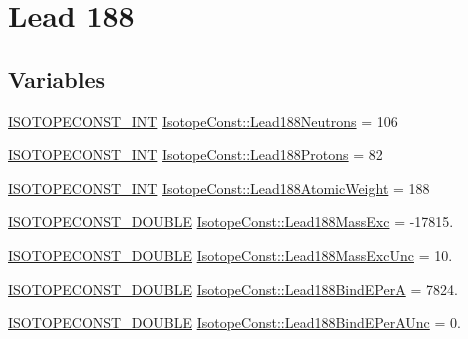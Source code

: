 \hypertarget{group___isotope_const-_lead-_pb188}{}\section{Lead 188}
\label{group___isotope_const-_lead-_pb188}
\subsection*{Variables}
\begin{DoxyCompactItemize}
\item 
\mbox{\hyperlink{group___isotope_const-_macros_ga5f18360b3e99483a35c32d789e62621c}{I\+S\+O\+T\+O\+P\+E\+C\+O\+N\+S\+T\+\_\+\+I\+NT}} \mbox{\hyperlink{group___isotope_const-_lead-_pb188_gac8e494fa1e14b751e539c2e1c9d168f4}{Isotope\+Const\+::\+Lead188\+Neutrons}} = 106
\item 
\mbox{\hyperlink{group___isotope_const-_macros_ga5f18360b3e99483a35c32d789e62621c}{I\+S\+O\+T\+O\+P\+E\+C\+O\+N\+S\+T\+\_\+\+I\+NT}} \mbox{\hyperlink{group___isotope_const-_lead-_pb188_gaf8585b1232ee8e63455d3f2e194e5493}{Isotope\+Const\+::\+Lead188\+Protons}} = 82
\item 
\mbox{\hyperlink{group___isotope_const-_macros_ga5f18360b3e99483a35c32d789e62621c}{I\+S\+O\+T\+O\+P\+E\+C\+O\+N\+S\+T\+\_\+\+I\+NT}} \mbox{\hyperlink{group___isotope_const-_lead-_pb188_ga2e9897e510550a646369dc732532142f}{Isotope\+Const\+::\+Lead188\+Atomic\+Weight}} = 188
\item 
\mbox{\hyperlink{group___isotope_const-_macros_ga8f45a7272ce02c0b4c65c44636ed719a}{I\+S\+O\+T\+O\+P\+E\+C\+O\+N\+S\+T\+\_\+\+D\+O\+U\+B\+LE}} \mbox{\hyperlink{group___isotope_const-_lead-_pb188_gad0d8f306ceae9d4c849d327a091eb935}{Isotope\+Const\+::\+Lead188\+Mass\+Exc}} = -\/17815.
\item 
\mbox{\hyperlink{group___isotope_const-_macros_ga8f45a7272ce02c0b4c65c44636ed719a}{I\+S\+O\+T\+O\+P\+E\+C\+O\+N\+S\+T\+\_\+\+D\+O\+U\+B\+LE}} \mbox{\hyperlink{group___isotope_const-_lead-_pb188_ga6389d48384c039ffe88dba688d18f6af}{Isotope\+Const\+::\+Lead188\+Mass\+Exc\+Unc}} = 10.
\item 
\mbox{\hyperlink{group___isotope_const-_macros_ga8f45a7272ce02c0b4c65c44636ed719a}{I\+S\+O\+T\+O\+P\+E\+C\+O\+N\+S\+T\+\_\+\+D\+O\+U\+B\+LE}} \mbox{\hyperlink{group___isotope_const-_lead-_pb188_ga4e6f5200fb4dfadbeb6774725b0bb7fd}{Isotope\+Const\+::\+Lead188\+Bind\+E\+PerA}} = 7824.
\item 
\mbox{\hyperlink{group___isotope_const-_macros_ga8f45a7272ce02c0b4c65c44636ed719a}{I\+S\+O\+T\+O\+P\+E\+C\+O\+N\+S\+T\+\_\+\+D\+O\+U\+B\+LE}} \mbox{\hyperlink{group___isotope_const-_lead-_pb188_gacfa0eaf06886fb4329f50fa291b673c2}{Isotope\+Const\+::\+Lead188\+Bind\+E\+Per\+A\+Unc}} = 0.

\end{DoxyCompactItemize}
